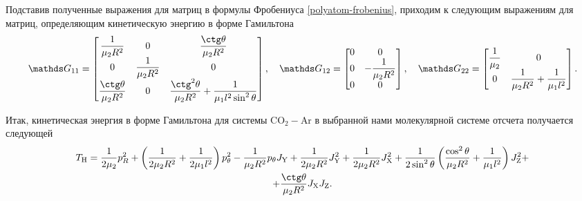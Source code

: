 Подставив полученные выражения для матриц в формулы Фробениуса \eqref{polyatom-frobenius}, приходим к следующим выражениям для матриц, определяющим кинетическую энергию в форме Гамильтона 
\begin{gather}
	\bbG_{11} =
	\begin{bmatrix}
		\dfrac{1}{\mu_2 R^2} & 0 & \dfrac{\ctg \theta}{\mu_2 R^2} \\
		0 & \dfrac{1}{\mu_2 R^2} & 0 \\
		\dfrac{\ctg \theta}{\mu_2 R^2} & 0 & \dfrac{\ctg^2 \theta}{\mu_2 R^2} + \dfrac{1}{\mu_1 l^2 \sin^2 \theta}
	\end{bmatrix}, \quad
	\bbG_{12} =
	\begin{bmatrix}
		0 & 0 \\
		0 & - \dfrac{1}{\mu_2 R^2} \\
		0 & 0
	\end{bmatrix}, \quad 
	\bbG_{22} = 
	\begin{bmatrix}
		\dfrac{1}{\mu_2} & 0 \\
		0 & \dfrac{1}{\mu_2 R^2} + \dfrac{1}{\mu_1 l^2}
	\end{bmatrix}. \notag
\end{gather}

Итак, кинетическая энергия в форме Гамильтона для системы CO$_2-$Ar в выбранной нами молекулярной системе отсчета получается следующей
\begin{gather}
\Th = \frac{1}{2 \mu_2} p_R^2 + \lb \frac{1}{2 \mu_2 R^2} + \frac{1}{2 \mu_1 l^2} \rb p_\theta^2 - \frac{1}{\mu_2 R^2} p_\theta \Jy + \frac{1}{2 \mu_2 R^2} \Jy^2 + \frac{1}{2 \mu_2 R^2} \Jx^2 + \frac{1}{2 \sin^2 \theta} \lb \frac{\cos^2 \theta}{\mu_2 R^2} + \frac{1}{\mu_1 l^2} \rb \Jz^2 + \notag \\
+ \frac{\ctg \theta}{\mu_2 R^2} \Jx \Jz. 
\end{gather}

